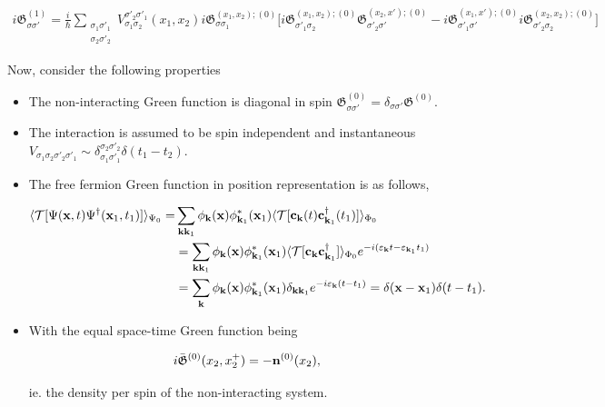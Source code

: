\documentclass{homework}
\begin{document}
\begin{equation}
    \begin{split}
        i \mathfrak{G}^{(1)}_{\sigma \sigma'} = \frac{i}{\hbar} \sum_{\substack{\sigma_1 \sigma'_1 \\
        \sigma_2 \sigma'_2}} V_{\sigma_1\sigma_2}^{\sigma'_2\sigma'_1}(x_1,x_2) i \mathfrak{G}^{(x_1, x_2); (0)}_{\sigma\sigma_1} \bigg[ i \mathfrak{G}^{(x_1,x_2); (0)}_{\sigma'_1\sigma_2}
        \mathfrak{G}^{(x_2, x'); (0)}_{\sigma'_2\sigma'} 
         -
        i \mathfrak{G}^{(x_1,x'); (0)}_{\sigma'_1\sigma'} 
        i \mathfrak{G}^{(x_2, x_2); (0)}_{\sigma'_2\sigma_2} \bigg]
    \end{split}
\end{equation}

Now, consider the following properties 

\begin{itemize}
    \item The non-interacting Green function is diagonal in spin $\mathfrak{G}_{\sigma \sigma'}^{(0)} = \delta_{\sigma \sigma'} \mathfrak{G}^{(0)}$.
    \item The interaction is assumed to be spin independent and instantaneous $V_{\sigma_1 \sigma_2 \sigma'_2 \sigma'_1} \sim \delta_{\sigma_1 \sigma'_1}^{\sigma_2 \sigma'_2} \delta(t_1-t_2)$.
    \item The free fermion Green function in position representation is as follows, 
    
\begin{equation}
    \begin{split}
        \langle \mathcal{T} [\Psi({\bf x},t) \Psi^\dagger({\bf x}_1, t_1)] \rangle_{\Psi_0} =& \sum_{{\bf k} {\bf k}_1} \phi_{{\bf k}}({\bf x})\phi^{*}_{{\bf k}_1}({\bf x}_1) \langle \mathcal{T} [{\bf c}_{{\bf k}}(t) {\bf c}_{{\bf k}_1}^\dagger(t_1)] \rangle_{\Phi_0} \\
        &= \sum_{{\bf k} {\bf k}_1} \phi_{{\bf k}}({\bf x})\phi^{*}_{{\bf k}_1}({\bf x}_1) \langle \mathcal{T} [{\bf c}_{{\bf k}} {\bf c}_{{\bf k}_1}^\dagger] \rangle_{\Phi_0} e^{-i(\varepsilon_{{\bf k}}t - {\varepsilon}_{{\bf k}_1} t_1)} \\
        &= \sum_{{\bf k}} \phi_{{\bf k}}({\bf x})\phi^{*}_{{\bf k}_1}({\bf x}_1) \delta_{{\bf k} {\bf k}_1} e^{-i\varepsilon_{{\bf k}}(t-t_1)} = \delta({\bf x} - {\bf x}_1) \delta(t-t_1). 
    \end{split}
\end{equation}

\item With the equal space-time Green function being 

\begin{equation}
    i \bar{\mathfrak{G}}^{(0)}(x_2, x_2^+) = - {\bf n}^{(0)}(x_2),
\end{equation}

        ie. the density per spin of the non-interacting system. 
\end{itemize}
\end{document}
